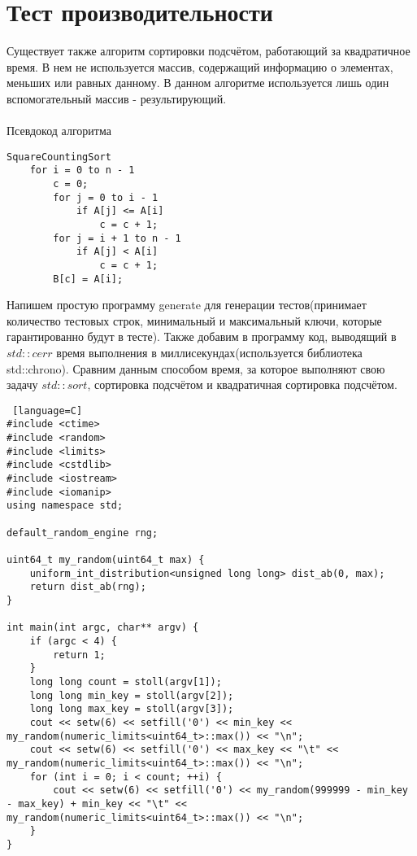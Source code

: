\section{Тест производительности}
Существует также алгоритм сортировки подсчётом, работающий за квадратичное время. В нем не используется массив, содержащий информацию о элементах, меньших или равных данному. В данном алгоритме используется лишь один вспомогательный массив - результирующий.\\\\
Псевдокод алгоритма\cite{wikipedia_sort}\\
\begin{lstlisting}
SquareCountingSort
    for i = 0 to n - 1
        c = 0;
        for j = 0 to i - 1
            if A[j] <= A[i]
                c = c + 1;
        for j = i + 1 to n - 1
            if A[j] < A[i]
                c = c + 1;
        B[c] = A[i];
\end{lstlisting}

Напишем простую программу generate для генерации тестов(принимает количество тестовых строк, минимальный и максимальный ключи, которые гарантированно будут в тесте). Также добавим в программу код, выводящий в $std::cerr$ время выполнения в миллисекундах(используется библиотека std::chrono). Сравним данным способом время, за которое выполняют свою задачу $std::sort$, сортировка подсчётом и квадратичная сортировка подсчётом.

\begin{lstlisting} [language=C]
#include <ctime>
#include <random>
#include <limits>
#include <cstdlib>
#include <iostream>
#include <iomanip>
using namespace std;

default_random_engine rng;

uint64_t my_random(uint64_t max) {
    uniform_int_distribution<unsigned long long> dist_ab(0, max);
    return dist_ab(rng);
}

int main(int argc, char** argv) {
    if (argc < 4) {
        return 1;
    }
    long long count = stoll(argv[1]);
    long long min_key = stoll(argv[2]);
    long long max_key = stoll(argv[3]);
    cout << setw(6) << setfill('0') << min_key << my_random(numeric_limits<uint64_t>::max()) << "\n";
    cout << setw(6) << setfill('0') << max_key << "\t" << my_random(numeric_limits<uint64_t>::max()) << "\n";
    for (int i = 0; i < count; ++i) {
        cout << setw(6) << setfill('0') << my_random(999999 - min_key - max_key) + min_key << "\t" << 	          my_random(numeric_limits<uint64_t>::max()) << "\n";
    }
}
\end{lstlisting}


